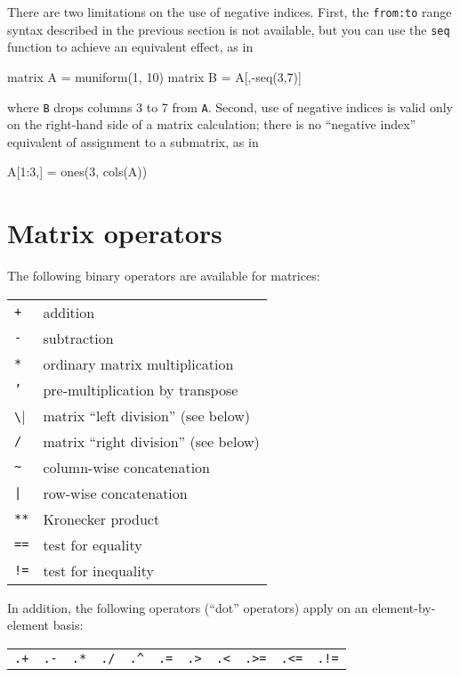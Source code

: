 There are two limitations on the use of negative indices. First, the
\texttt{from:to} range syntax described in the previous section is not
available, but you can use the \texttt{seq} function to achieve an
equivalent effect, as in
%
\begin{code}
matrix A = muniform(1, 10)
matrix B = A[,-seq(3,7)]
\end{code}
%
where \texttt{B} drops columns 3 to 7 from \texttt{A}. Second, use of
negative indices is valid only on the right-hand side of a matrix
calculation; there is no ``negative index'' equivalent of assignment
to a submatrix, as in
%
\begin{code}
A[1:3,] = ones(3, cols(A))
\end{code}

\section{Matrix operators}
\label{matrix-op}

The following binary operators are available for matrices:

\begin{center}
\begin{tabular}{ll}
\texttt{+}  & addition \\
\texttt{-}  & subtraction \\
\texttt{*}  & ordinary matrix multiplication \\
\texttt{'}  & pre-multiplication by transpose \\
\verb|\|    & matrix ``left division'' (see below) \\
\texttt{/}  & matrix ``right division'' (see below) \\
\verb+~+    & column-wise concatenation \\
\verb+|+    & row-wise concatenation \\
\texttt{**} & Kronecker product \\
\texttt{==}  & test for equality \\
\texttt{!=} & test for inequality
\end{tabular}
\end{center}

In addition, the following operators (``dot'' operators) apply on an
element-by-element basis:

\begin{center}
\begin{tabular}{ccccccccccc}
\texttt{.+}  &  \texttt{.-}  &
\texttt{.*}  &  \texttt{./}  &  \verb+.^+  &
\texttt{.=}  &  \texttt{.>}  &  \texttt{.<} &
\texttt{.>=}  &  \texttt{.<=} & \texttt{.!=}
\end{tabular}
\end{center}


